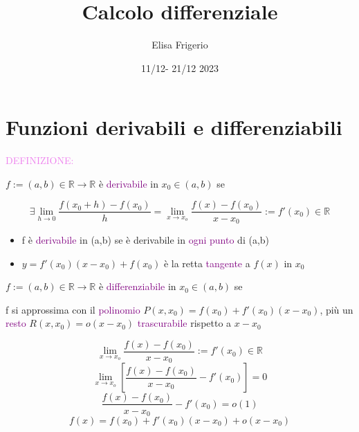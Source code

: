 \documentclass{article}
\title{Calcolo differenziale}
\author{Elisa Frigerio }
\date{11/12- 21/12 2023}
\begin{document}
\maketitle

\section{Funzioni derivabili e differenziabili}

\begin{tcolorbox}[colback = pink!10!white,   colframe=red!50!blue]
  \textcolor{violet}{DEFINIZIONE: }

  $f:=(a, b) \in \mathbb{R} \to \mathbb{R}$ è \textcolor{purple}{derivabile} in $x_0 \in (a, b)$ se

  \[ \exists \lim_{h \to 0} \frac{f(x_0 + h) -f(x_0)}{h}=\lim_{x \to x_o} \frac{f(x) -f(x_0)}{x-x_0}:=f'(x_0) \in \mathbb{R}\]

\end{tcolorbox}

\begin{tcolorbox}[colback=white, colframe=purple]
 \begin{itemize}
     \item f è \textcolor{purple}{derivabile} in (a,b) se è derivabile in \textcolor{purple}{ogni punto} di (a,b)
     \item $y=f'(x_0)(x-x_0)+f(x_0)$ è la retta \textcolor{purple}{tangente} a $f(x)$ in $x_0$
 \end{itemize}

\end{tcolorbox}


\begin{tcolorbox}[colback = pink!10!white,   colframe=red!50!blue]

  $f:=(a, b) \in \mathbb{R} \to \mathbb{R}$ è \textcolor{purple}{differenziabile} in $x_0 \in (a, b)$ se

  f si approssima con il \textcolor{purple}{polinomio} $P(x,x_0)=f(x_0) + f'(x_0)(x - x_0)$, più un \textcolor{purple}{resto} $R(x, x_0) = o(x-x_0)$ \textcolor{purple}{trascurabile} rispetto a $x - x_0$


\end{tcolorbox}

\[\lim_{x \to x_o} \frac{f(x) -f(x_0)}{x-x_0}:=f'(x_0) \in \mathbb{R}\]
\[\lim_{x \to x_o} \left[\frac{f(x) -f(x_0)}{x-x_0} - f'(x_0) \right] = 0\]
\[\frac{f(x) -f(x_0)}{x-x_0} - f'(x_0)  = o(1)\]
\[f(x) = f(x_0) + f'(x_0)(x - x_0) + o(x - x_0)\]
\end{document}
